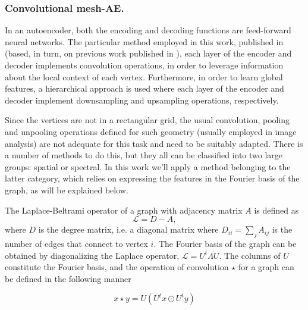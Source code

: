 \documentclass[twocolumn]{llncs}
\begin{document}


\subsubsection{Convolutional mesh-AE.}

In an autoencoder, both the encoding and decoding functions are feed-forward neural networks.
The particular method employed in this work, published in \cite{ref_coma} (based, in turn, on previous work published in \cite{ref_spectral_graph_conv} ), each layer of the encoder and decoder implements convolution operations, in order to leverage information about the local context of each vertex. Furthermore, in order to learn global features, a hierarchical approach is used where each layer of the encoder and decoder implement downsampling and upsampling operations, respectively. 
 
Since the vertices are not in a rectangular grid, the usual convolution, pooling and unpooling operations defined for such geometry (usually employed in image analysis) are not adequate for this task and need to be suitably adapted. There is a number of methods to do this, but they all can be classified into two large groups: spatial or spectral. In this work we'll apply a method belonging to the latter category, which relies on expressing the features in the Fourier basis of the graph, as will be explained below.

The Laplace-Beltrami operator of a graph with adjacency matrix $A$ is defined as
\begin{equation}
\mathcal{L}=D-A,
\end{equation}{}
\noindent 
where $D$ is the degree matrix, i.e. a diagonal matrix where $D_{ii}=\sum_{j}A_{ij}$ is the number of edges that connect to vertex $i$. The Fourier basis of the graph can be obtained by diagonalizing the Laplace operator, $\mathcal{L}=U^t\Lambda U$. The columns of $U$ constitute the Fourier basis, and the operation of convolution $\star$ for a graph can be defined in the following manner

\begin{equation}
x\star y =U(U^tx\odot U^ty)
\end{equation}{}
\end{document}
